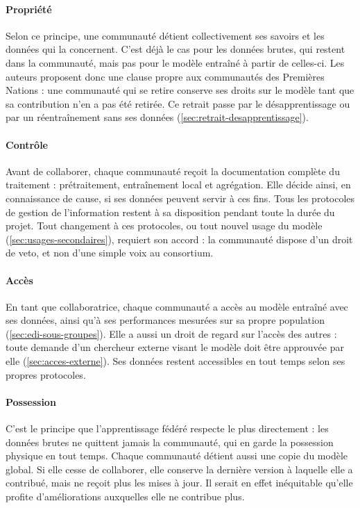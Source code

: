 \paragraph{Propriété}
Selon ce principe, une communauté détient collectivement ses savoirs et les données qui la concernent\cite{zotero-item-1479}.
C'est déjà le cas pour les données brutes, qui restent dans la communauté, mais pas pour le modèle entraîné à partir de celles-ci.
Les auteurs proposent donc une clause propre aux communautés des Premières Nations : une communauté qui se retire conserve ses droits sur le modèle tant que sa contribution n'en a pas été retirée.
Ce retrait passe par le désapprentissage ou par un réentraînement sans ses données (\cref{sec:retrait-desapprentissage}).

\paragraph{Contrôle}
Avant de collaborer, chaque communauté reçoit la documentation complète du traitement : prétraitement, entraînement local et agrégation.
Elle décide ainsi, en connaissance de cause, si ses données peuvent servir à ces fins.
Tous les protocoles de gestion de l'information restent à sa disposition pendant toute la durée du projet.
Tout changement à ces protocoles, ou tout nouvel usage du modèle (\cref{sec:usages-secondaires}), requiert son accord : la communauté dispose d'un droit de veto, et non d'une simple voix au consortium.

\paragraph{Accès}
En tant que collaboratrice, chaque communauté a accès au modèle entraîné avec ses données, ainsi qu'à ses performances mesurées sur sa propre population (\cref{sec:edi-sous-groupes})\cite{zotero-item-1479}.
Elle a aussi un droit de regard sur l'accès des autres : toute demande d'un chercheur externe visant le modèle doit être approuvée par elle (\cref{sec:acces-externe}).
Ses données restent accessibles en tout temps selon ses propres protocoles.

\paragraph{Possession}
C'est le principe que l'apprentissage fédéré respecte le plus directement : les données brutes ne quittent jamais la communauté, qui en garde la possession physique en tout temps.
Chaque communauté détient aussi une copie du modèle global.
Si elle cesse de collaborer, elle conserve la dernière version à laquelle elle a contribué, mais ne reçoit plus les mises à jour.
Il serait en effet inéquitable qu'elle profite d'améliorations auxquelles elle ne contribue plus.




